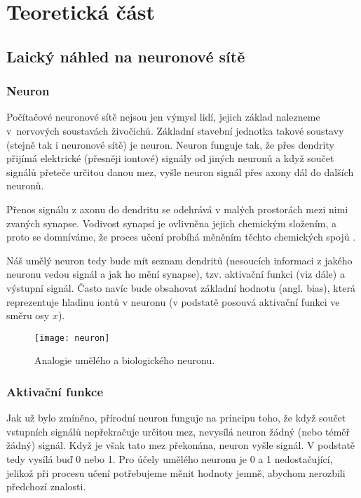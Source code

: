 \documentclass[12pt]{report}			%
\begin{document}
	
	\part{Teoretická část}
		
			\chapter{Laický náhled na neuronové sítě}
			
				\section{Neuron}
					Počítačové neuronové sítě nejsou jen výmysl lidí, jejich základ nalezneme v~nervových soustavách živočichů. Základní stavební jednotka takové soustavy (stejně tak i neuronové sítě) je neuron. Neuron funguje tak, že přes \gls{dendrit}y přijímá elektrické (přesněji iontové) signály od jiných neuronů a když součet signálů přeteče určitou danou mez, vyšle neuron signál přes \gls{axon}y dál do dalších neuronů.
					
					Přenos signálu z \gls{axon}u do \gls{dendrit}u se odehrává v malých prostorách mezi nimi zvaných \gls{synapse}. Vodivost synapsí je ovlivněna jejich chemickým složením, a proto se domníváme, že proces učení probíhá měněním těchto chemických spojů \autocite[s. 491]{Book:Informatika}.
					
					Náš umělý neuron tedy bude mít seznam \gls{dendrit}ů (nesoucích informaci z jakého neuronu vedou signál a jak ho mění \gls{synapse}), tzv. aktivační funkci (viz dále) a výstupní signál. Často navíc bude obsahovat základní hodnotu (angl. bias), která reprezentuje hladinu iontů v neuronu (v podstatě posouvá aktivační funkci ve směru osy $x$).
					
					\begin{figure}
						\texttt{[image: neuron]}
						\caption{Analogie umělého a biologického neuronu.}
						\label{fig:neuron}
					\end{figure}
				
				\section{Aktivační funkce}
					Jak už bylo zmíněno, přírodní neuron funguje na principu toho, že když součet vstupních signálů nepřekračuje určitou mez, nevysílá neuron žádný (nebo téměř žádný) signál. Když je však tato mez překonána, neuron vyšle signál. V podstatě tedy vysílá buď 0 nebo 1. Pro účely umělého neuronu je 0 a 1 nedostačující, jelikož při procesu učení potřebujeme měnit hodnoty jemně, abychom nerozbili předchozí znalosti.
					
\end{document}
